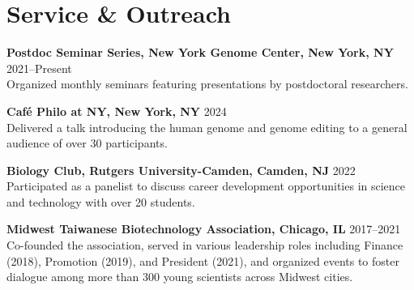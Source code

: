 \documentclass[letterpaper,11pt]{cv}
\begin{document}
\section{Service \& Outreach}
\begin{entrylist}
    \item \textbf{Postdoc Seminar Series, New York Genome Center, New York, NY} \hfill 2021--Present \\
    {\small Organized monthly seminars featuring presentations by postdoctoral researchers.}
    \item \textbf{Café Philo at NY, New York, NY} \hfill 2024 \\
    {\small Delivered a talk introducing the human genome and genome editing to a general audience of over 30 participants.}
    \item \textbf{Biology Club, Rutgers University-Camden, Camden, NJ} \hfill 2022 \\
    {\small Participated as a panelist to discuss career development opportunities in science and technology with over 20 students.}
    \item \textbf{Midwest Taiwanese Biotechnology Association, Chicago, IL} \hfill 2017--2021 \\
    {\small Co-founded the association, served in various leadership roles including Finance (2018), Promotion (2019), and President (2021), and organized events to foster dialogue among more than 300 young scientists across Midwest cities.}

\end{entrylist}


    
    
    
    
\end{document}
